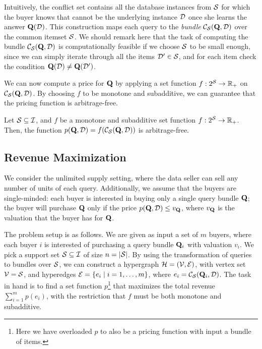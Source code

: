 Intuitively, the conflict set contains all the database instances from $\mathcal{S}$ for which the buyer knows that cannot be the underlying instance $\mathcal{D}$ once she learns the answer $\mathbf{Q}(\mathcal{D})$. This construction maps each query to the {\em  bundle} ${\mathcal{C}}_{\mathcal{S}}(\mathbf{Q},\mathcal{D}) $ over the common itemset $\mathcal{S}$. We should remark here that the task of computing the bundle ${\mathcal{C}}_{\mathcal{S}}(\mathbf{Q},\mathcal{D}) $ is computationally feasible if we choose $\mathcal{S}$ to be small enough, since we can simply iterate through all the items $\mathcal{D}' \in \mathcal{S}$, and for each item check the condition 
$\mathbf{Q}(\mathcal{D}) \neq \mathbf{Q}(\mathcal{D}')$.

We can now compute a price for $\mathbf{Q}$ by applying a set function $f: 2^{\mathcal{S}} \rightarrow  \mathbb{R}_+$ on ${\mathcal{C}}_{\mathcal{S}}(\mathbf{Q}, \mathcal{D})$. 
By choosing $f$ to be monotone and subadditive, we can guarantee that the pricing function is arbitrage-free.

\begin{theorem} \label{cor:arbitrage}
Let $\mathcal{S} \subseteq \mathcal{I}$, and $f$ be a monotone and subadditive set function $f: 2^{\mathcal{S}} \rightarrow  \mathbb{R}_+$. Then, the function $p(\mathbf{Q}, \mathcal{D}) = f({\mathcal{C}}_{\mathcal{S}}(\mathbf{Q}, \mathcal{D}))$ is arbitrage-free.
\end{theorem}

\subsection{Revenue Maximization}

We consider the unlimited supply setting, where the data seller can sell any number of units of each query. 
Additionally, we assume that the buyers are single-minded: each buyer is interested in buying only a single query bundle $\mathbf{Q}$; the buyer will purchase $\mathbf{Q}$ only if the price $p(\mathbf{Q}, \mathcal{D}) \leq v_{\mathbf{Q}}$, where $v_{\mathbf{Q}}$ is the valuation  that the buyer has for $\mathbf{Q}$. 

The problem setup is as follows. We are given as input a set of $m$ buyers, where each buyer $i$ is interested of purchasing a query bundle $\mathbf{Q}_i$ with valuation $v_i$. We pick a support set $\mathcal{S} \subseteq \mathcal{I}$ of size $n = |\mathcal{S}|$. By using the transformation of queries to bundles over $\mathcal{S}$, we can construct a hypergraph $\mathcal{H} = (\mathcal{V},\mathcal{E})$, with vertex set $\mathcal{V} = \mathcal{S}$, and hyperedges $\mathcal{E} = \{{e_i}\mid{i =1, \dots, m}\}$, where $e_i ={\mathcal{C}}_{\mathcal{S}}(\mathbf{Q}_i, \mathcal{D})$.
The task in hand is to find a set function $p$\footnote{Here we have overloaded $p$ to also be a pricing function with input a bundle of items.} that maximizes the total revenue $\sum_{i=1}^m p(e_i)$, with the restriction that $f$ must be both monotone and subadditive. 

